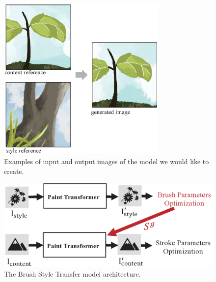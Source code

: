 \documentclass{mva_style}
\begin{document}
\begin{figure}
  \centering
  \includegraphics[width=83mm]{resource/haru.eps}
  \caption{Examples of input and output images of the model we would like to create.}
  \label{fig:haru}
\end{figure}

\begin{figure}[t]
  \centering
  \includegraphics[width=166mm]{resource/target_model.eps}
  \caption{The Brush Style Transfer model architecture.}
  \label{fig:final_model}
\end{figure}
\end{document}
